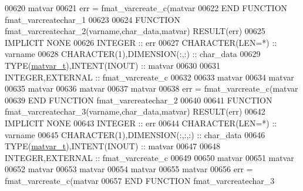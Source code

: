 \begin{DoxyCode}
00620     matvar%
00621     err = fmat\_varcreate\_c(matvar%
00622 \textcolor{keyword}{END FUNCTION }fmat\_varcreatechar\_1
00623 
00624 \textcolor{keyword}{FUNCTION }fmat\_varcreatechar\_2(varname,char\_data,matvar) \textcolor{keyword}{RESULT}(err)
00625 \textcolor{keywordtype}{IMPLICIT NONE}
00626     \textcolor{keywordtype}{INTEGER}                         :: err
00627     \textcolor{keywordtype}{CHARACTER(LEN=*)}                :: varname
00628     \textcolor{keywordtype}{CHARACTER(1)},\textcolor{keywordtype}{DIMENSION(:,:)}     :: char\_data
00629     \textcolor{keywordtype}{TYPE}(\hyperlink{group___m_a_t_structmatvar__t}{matvar\_t}),\textcolor{keywordtype}{INTENT(INOUT)}    :: matvar
00630 
00631     \textcolor{keywordtype}{INTEGER},\textcolor{keywordtype}{EXTERNAL}                :: fmat\_varcreate\_c
00632 
00633     matvar%
00634     matvar%
00635     matvar%
00636     matvar%
00637     matvar%
00638     err = fmat\_varcreate\_c(matvar%
00639 \textcolor{keyword}{END FUNCTION }fmat\_varcreatechar\_2
00640 
00641 \textcolor{keyword}{FUNCTION }fmat\_varcreatechar\_3(varname,char\_data,matvar) \textcolor{keyword}{RESULT}(err)
00642 \textcolor{keywordtype}{IMPLICIT NONE}
00643     \textcolor{keywordtype}{INTEGER}                         :: err
00644     \textcolor{keywordtype}{CHARACTER(LEN=*)}                :: varname
00645     \textcolor{keywordtype}{CHARACTER(1)},\textcolor{keywordtype}{DIMENSION(:,:,:)}   :: char\_data
00646     \textcolor{keywordtype}{TYPE}(\hyperlink{group___m_a_t_structmatvar__t}{matvar\_t}),\textcolor{keywordtype}{INTENT(INOUT)}    :: matvar
00647 
00648     \textcolor{keywordtype}{INTEGER},\textcolor{keywordtype}{EXTERNAL}                :: fmat\_varcreate\_c
00649 
00650     matvar%
00651     matvar%
00652     matvar%
00653     matvar%
00654     matvar%
00655     matvar%
00656     err = fmat\_varcreate\_c(matvar%
00657 \textcolor{keyword}{END FUNCTION }fmat\_varcreatechar\_3
\end{DoxyCode}
